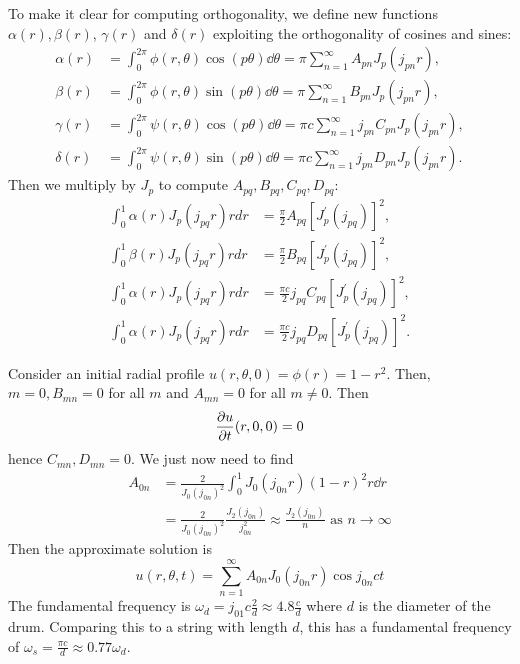 \documentclass[a4paper]{article}
\begin{document}
To make it clear for computing orthogonality, we define new functions $\alpha(r), \beta(r)$, $\gamma(r)$ and $\delta(r)$ exploiting the orthogonality of cosines and sines:
\[
\begin{aligned}
\alpha(r) & = \int_0^{2 \pi} \phi(r, \theta) \cos (p \theta) \dd \theta=\pi \sum_{n=1}^{\infty} A_{p n} J_p\left(j_{p n} r\right), \\
\beta(r) & = \int_0^{2 \pi} \phi(r, \theta) \sin (p \theta) \dd \theta=\pi \sum_{n=1}^{\infty} B_{p n} J_p\left(j_{p n} r\right), \\
\gamma(r) & = \int_0^{2 \pi} \psi(r, \theta) \cos (p \theta) \dd \theta=\pi c \sum_{n=1}^{\infty} j_{p n} C_{p n} J_p\left(j_{p n} r\right), \\
\delta(r) & = \int_0^{2 \pi} \psi(r, \theta) \sin (p \theta) \dd \theta=\pi c \sum_{n=1}^{\infty} j_{p n} D_{p n} J_p\left(j_{p n} r\right) .
\end{aligned}
\]
Then we multiply by $J_p$ to compute $A_{pq},B_{pq},C_{pq},D_{pq}$: 
\[
    \begin{aligned}
        \int_0^1 \alpha(r) J_p\left(j_{p q} r\right) r d r &=\frac{\pi}{2} A_{p q}\left[J_p^{\prime}\left(j_{p q}\right)\right]^2, \\
        \int_0^1 \beta(r) J_p\left(j_{p q} r\right) r d r &=\frac{\pi}{2} B_{p q}\left[J_p^{\prime}\left(j_{p q}\right)\right]^2, \\
        \int_0^1 \alpha(r) J_p\left(j_{p q} r\right) r d r &=\frac{\pi c}{2} j_{p q} C_{p q}\left[J_p^{\prime}\left(j_{p q}\right)\right]^2, \\
        \int_0^1 \alpha(r) J_p\left(j_{p q} r\right) r d r &=\frac{\pi c}{2} j_{p q} D_{p q}\left[J_p^{\prime}\left(j_{p q}\right)\right]^2 .
    \end{aligned}
\]
\begin{example}
	Consider an initial radial profile \( u(r,\theta,0) = \phi(r) = 1 - r^2 \).
	Then, \( m = 0, B_{mn} = 0 \) for all \( m \) and \( A_{mn} = 0 \) for all \( m \neq 0 \).
	Then
	\[
		\pdv{u}{t}\qty(r,0,0) = 0
	\]
	hence \( C_{mn}, D_{mn} = 0 \).
	We just now need to find
	\[
		\begin{aligned}
            A_{0n} &= \frac{2}{J_0(j_{0n})^2} \int_0^1 J_0(j_{0n}r)(1-r)^2 r\dd{r} \\ 
            &= \frac{2}{J_0(j_{0n})^2} \frac{J_2(j_{0n})}{j_{0n}^2} \approx \frac{J_2(j_{0n})}{n} \text{ as } n \to \infty
        \end{aligned}
	\]
	Then the approximate solution is
	\[
		u(r,\theta,t) = \sum_{n=1}^\infty A_{0n} J_0(j_{0n}r)\cos j_{0n} ct
	\]
	The fundamental frequency is \( \omega_d = j_{01} c \frac{2}{d} \approx 4.8\frac{c}{d} \) where \( d \) is the diameter of the drum.
	Comparing this to a string with length \( d \), this has a fundamental frequency of \( \omega_s = \frac{\pi c}{d} \approx 0.77 \omega_d \).
\end{example}
\end{document}
